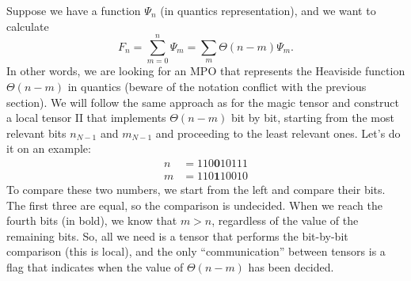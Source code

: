 \documentclass{SciPost}
\begin{document}
Suppose we have a function $\Psi_n$ (in quantics representation), and we want to calculate
\begin{equation}
F_n = \sum_{m=0}^n \Psi_m =\sum_m \Theta(n-m)\Psi_m.
\end{equation}
In other words, we are looking for an MPO that represents the Heaviside function
$\Theta(n-m)$ in quantics (beware of the notation conflict with the previous section). We will follow the same approach as for the magic tensor and
construct a local tensor $\text{II}$ that implements  $\Theta(n-m)$ bit by bit, starting from the most relevant bits $n_{N-1}$ and $m_{N-1}$ and proceeding to the least relevant ones. Let's do it on an example:
\begin{eqnarray}
n &= 110\textbf{0}10111 \nonumber \\
m &= 110\textbf{1}10010 \nonumber
\end{eqnarray}
To compare these two numbers, we start from the left and compare their bits. The first three are equal, so the comparison is undecided. When we reach the fourth bits (in bold), we know that $m>n$, regardless of the value of the remaining bits. So, all we need is a tensor that performs the bit-by-bit comparison (this is local), and the only ``communication'' between tensors is a flag that indicates when the value of $\Theta(n-m)$ has been decided.
\end{document}
